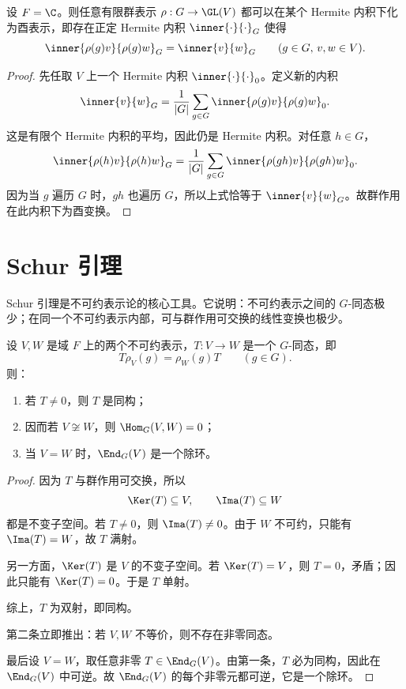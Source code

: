 \begin{proposition}
设 $F=\C$。则任意有限群表示 $\rho:G\to \GL(V)$ 都可以在某个 Hermite 内积下化为酉表示，即存在正定 Hermite 内积 $\inner{\cdot}{\cdot}_G$ 使得
\[
\inner{\rho(g)v}{\rho(g)w}_G=\inner{v}{w}_G
\qquad (g\in G,\,v,w\in V).
\]
\end{proposition}

\begin{proof}
先任取 $V$ 上一个 Hermite 内积 $\inner{\cdot}{\cdot}_0$。定义新的内积
\[
\inner{v}{w}_G=\frac{1}{|G|}\sum_{g\in G}\inner{\rho(g)v}{\rho(g)w}_0.
\]
这是有限个 Hermite 内积的平均，因此仍是 Hermite 内积。对任意 $h\in G$，
\[
\inner{\rho(h)v}{\rho(h)w}_G
=\frac{1}{|G|}\sum_{g\in G}\inner{\rho(gh)v}{\rho(gh)w}_0.
\]
因为当 $g$ 遍历 $G$ 时，$gh$ 也遍历 $G$，所以上式恰等于 $\inner{v}{w}_G$。故群作用在此内积下为酉变换。
\end{proof}

\section{Schur 引理}

Schur 引理是不可约表示论的核心工具。它说明：不可约表示之间的 $G$-同态极少；在同一个不可约表示内部，可与群作用可交换的线性变换也极少。

\begin{theorem}[Schur 引理]
设 $V,W$ 是域 $F$ 上的两个不可约表示，$T:V\to W$ 是一个 $G$-同态，即
\[
T\rho_V(g)=\rho_W(g)T\qquad (g\in G).
\]
则：
\begin{enumerate}[label=\textnormal{(\arabic*)}]
  \item 若 $T\neq 0$，则 $T$ 是同构；
  \item 因而若 $V\not\cong W$，则 $\Hom_G(V,W)=0$；
  \item 当 $V=W$ 时，$\End_G(V)$ 是一个除环。
\end{enumerate}
\end{theorem}

\begin{proof}
因为 $T$ 与群作用可交换，所以
\[
\Ker(T)\subseteq V,\qquad \Ima(T)\subseteq W
\]
都是不变子空间。若 $T\neq 0$，则 $\Ima(T)\neq 0$。由于 $W$ 不可约，只能有 $\Ima(T)=W$，故 $T$ 满射。

另一方面，$\Ker(T)$ 是 $V$ 的不变子空间。若 $\Ker(T)=V$，则 $T=0$，矛盾；因此只能有 $\Ker(T)=0$。于是 $T$ 单射。

综上，$T$ 为双射，即同构。

第二条立即推出：若 $V,W$ 不等价，则不存在非零同态。

最后设 $V=W$，取任意非零 $T\in \End_G(V)$。由第一条，$T$ 必为同构，因此在 $\End_G(V)$ 中可逆。故 $\End_G(V)$ 的每个非零元都可逆，它是一个除环。
\end{proof}

